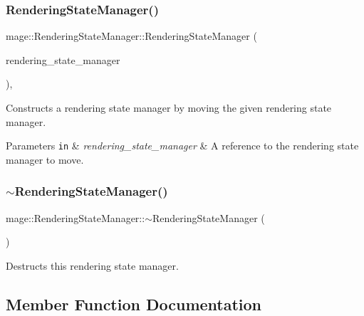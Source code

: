 \subsubsection{\texorpdfstring{Rendering\+State\+Manager()}{RenderingStateManager()}\hspace{0.1cm}{\footnotesize\ttfamily [3/3]}}
{\footnotesize\ttfamily mage\+::\+Rendering\+State\+Manager\+::\+Rendering\+State\+Manager (\begin{DoxyParamCaption}\item[{\hyperlink{classmage_1_1_rendering_state_manager}{Rendering\+State\+Manager} \&\&}]{rendering\+\_\+state\+\_\+manager }\end{DoxyParamCaption})\hspace{0.3cm}{\ttfamily [default]}, {\ttfamily [noexcept]}}

Constructs a rendering state manager by moving the given rendering state manager.


\begin{DoxyParams}[1]{Parameters}
\mbox{\tt in}  & {\em rendering\+\_\+state\+\_\+manager} & A reference to the rendering state manager to move. \\
\hline
\end{DoxyParams}
\hypertarget{classmage_1_1_rendering_state_manager_ad4865219aaaac55dd53c4ab51af8d63f}{}\label{classmage_1_1_rendering_state_manager_ad4865219aaaac55dd53c4ab51af8d63f} 
\subsubsection{\texorpdfstring{$\sim$\+Rendering\+State\+Manager()}{~RenderingStateManager()}}
{\footnotesize\ttfamily mage\+::\+Rendering\+State\+Manager\+::$\sim$\+Rendering\+State\+Manager (\begin{DoxyParamCaption}{ }\end{DoxyParamCaption})\hspace{0.3cm}{\ttfamily [default]}}

Destructs this rendering state manager. 

\subsection{Member Function Documentation}
\hypertarget{classmage_1_1_rendering_state_manager_a0ae04882682ccccd4e75830bd2b4159b}{}\label{classmage_1_1_rendering_state_manager_a0ae04882682ccccd4e75830bd2b4159b} 
